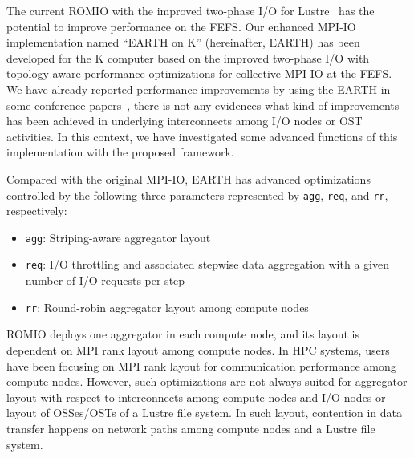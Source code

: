 \documentclass{jhps}
\begin{document}
The current ROMIO with the improved two-phase I/O for Lustre~\cite{lustre-adio:whpaper-2008}
has the potential to improve performance on the FEFS.
Our enhanced MPI-IO implementation named ``EARTH on K''
(hereinafter, EARTH) has been developed for the K computer
based on the improved two-phase I/O with topology-aware performance optimizations
for collective MPI-IO at the FEFS.
We have already reported performance improvements by using the EARTH
in some conference papers~\cite{tsujita:WS_EuroMPI2014,tsujita:hpcasia18},
there is not any evidences what kind of improvements has been achieved
in underlying interconnects among I/O nodes or OST activities.
In this context, we have investigated some advanced functions of
this implementation with the proposed framework.

Compared with the original MPI-IO, EARTH has advanced optimizations
controlled by the following three parameters represented by {\tt agg}, {\tt req},
and {\tt rr}, respectively:
%
\begin{itemize}
\item {\tt agg}: Striping-aware aggregator layout
\item {\tt req}: I/O throttling and associated stepwise data aggregation
with a given number of I/O requests per step
\item {\tt rr}: Round-robin aggregator layout among compute nodes
\end{itemize}
%

ROMIO deploys one aggregator in each compute node, and its layout is dependent on
MPI rank layout among compute nodes.
In HPC systems, users have been focusing on MPI rank layout
for communication performance among compute nodes.
However, such optimizations are not always suited for aggregator layout
with respect to interconnects among compute nodes and I/O nodes
or layout of OSSes/OSTs of a Lustre file system.
In such layout, contention in data transfer happens
on network paths among compute nodes and a Lustre file system.
\end{document}

